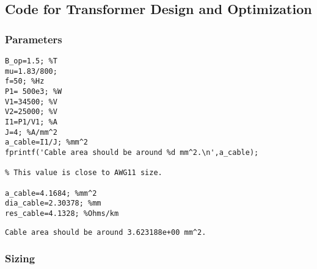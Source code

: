 \sloppy
{}
\setlength{\parindent}{0pt}

\subsection*{Code for Transformer Design and Optimization}   
    
\subsubsection*{Parameters}

\begin{verbatim}
B_op=1.5; %T
mu=1.83/800;
f=50; %Hz
P1= 500e3; %W
V1=34500; %V
V2=25000; %V
I1=P1/V1; %A
J=4; %A/mm^2
a_cable=I1/J; %mm^2
fprintf('Cable area should be around %d mm^2.\n',a_cable);

% This value is close to AWG11 size.

a_cable=4.1684; %mm^2
dia_cable=2.30378; %mm
res_cable=4.1328; %Ohms/km
\end{verbatim}

        \color{lightgray} \begin{verbatim}Cable area should be around 3.623188e+00 mm^2.
\end{verbatim} \color{black}
    

\subsubsection*{Sizing}

